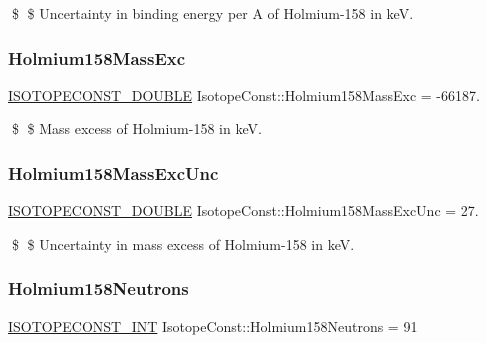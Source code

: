 \$ \$ Uncertainty in binding energy per A of Holmium-\/158 in keV. \mbox{\label{group___isotope_const-_holmium-_ho158_ga388d10581fb9ea73bb8b67ed8aaddfd9}} 
\subsubsection{\texorpdfstring{Holmium158\+Mass\+Exc}{Holmium158MassExc}}
{\footnotesize\ttfamily \mbox{\hyperlink{group___isotope_const-_macros_ga8f45a7272ce02c0b4c65c44636ed719a}{I\+S\+O\+T\+O\+P\+E\+C\+O\+N\+S\+T\+\_\+\+D\+O\+U\+B\+LE}} Isotope\+Const\+::\+Holmium158\+Mass\+Exc = -\/66187.}

\$ \$ Mass excess of Holmium-\/158 in keV. \mbox{\label{group___isotope_const-_holmium-_ho158_gac956f1c927b65123e94e6cadec7ad438}} 
\subsubsection{\texorpdfstring{Holmium158\+Mass\+Exc\+Unc}{Holmium158MassExcUnc}}
{\footnotesize\ttfamily \mbox{\hyperlink{group___isotope_const-_macros_ga8f45a7272ce02c0b4c65c44636ed719a}{I\+S\+O\+T\+O\+P\+E\+C\+O\+N\+S\+T\+\_\+\+D\+O\+U\+B\+LE}} Isotope\+Const\+::\+Holmium158\+Mass\+Exc\+Unc = 27.}

\$ \$ Uncertainty in mass excess of Holmium-\/158 in keV. \mbox{\label{group___isotope_const-_holmium-_ho158_ga6da89349211a3ee9ae8b24a069776287}} 
\subsubsection{\texorpdfstring{Holmium158\+Neutrons}{Holmium158Neutrons}}
{\footnotesize\ttfamily \mbox{\hyperlink{group___isotope_const-_macros_ga5f18360b3e99483a35c32d789e62621c}{I\+S\+O\+T\+O\+P\+E\+C\+O\+N\+S\+T\+\_\+\+I\+NT}} Isotope\+Const\+::\+Holmium158\+Neutrons = 91}

